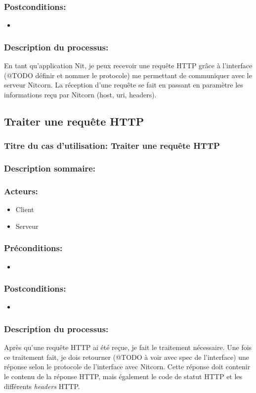 \documentclass{scrreprt}
\begin{document}
\subsubsection{Postconditions:}
\begin{itemize}
    \item  
\end{itemize} 
\subsubsection{Description du processus:}En tant qu'application Nit, je peux recevoir une requête HTTP grâce à l'interface
(@TODO définir et nommer le protocole) me permettant de communiquer avec le serveur
Nitcorn. La réception d'une requête se fait en passant en paramètre les informations
reçu par Nitcorn (host, uri, headers).
\subsection{Traiter une requête HTTP}
\subsubsection{Titre du cas d'utilisation: Traiter une requête HTTP}
\subsubsection{Description sommaire:}
\subsubsection{Acteurs:}
\begin{itemize}
    \item Client
    \item Serveur
\end{itemize}
\subsubsection{Préconditions:}
\begin{itemize}
    \item  
\end{itemize} 
\subsubsection{Postconditions:}
\begin{itemize}
    \item  
\end{itemize} 
\subsubsection{Description du processus:}Après qu'une requête HTTP ai été reçue, je fait le traitement nécessaire.
Une fois ce traitement fait, je dois retourner (@TODO à voir avec spec de l'interface)
une réponse selon le protocole de l'interface avec Nitcorn. Cette réponse doit
contenir le contenu de la réponse HTTP, mais également le code de statut HTTP
et les différents \textit{headers} HTTP.
\end{document}
